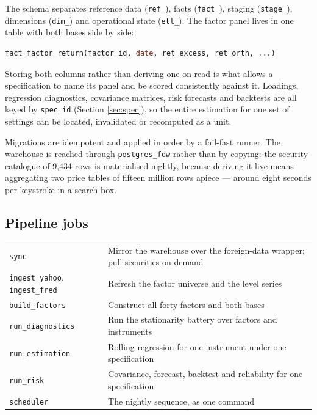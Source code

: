 \documentclass[11pt,a4paper]{article}
\newcommand{\code}[1]{\texttt{\small #1}}
\begin{document}
The schema separates reference data (\code{ref\_}), facts (\code{fact\_}),
staging (\code{stage\_}), dimensions (\code{dim\_}) and operational state
(\code{etl\_}). The factor panel lives in one table with both bases side by side:

\begin{lstlisting}[language=SQL]
fact_factor_return(factor_id, date, ret_excess, ret_orth, ...)
\end{lstlisting}

Storing both columns rather than deriving one on read is what allows a specification
to name its panel and be scored consistently against it. Loadings, regression
diagnostics, covariance matrices, risk forecasts and backtests are all keyed by
\code{spec\_id} (Section \ref{sec:spec}), so the entire estimation for one set of
settings can be located, invalidated or recomputed as a unit.

Migrations are idempotent and applied in order by a fail-fast runner. The warehouse is
reached through \code{postgres\_fdw} rather than by copying: the security catalogue of
9{,}434 rows is materialised nightly, because deriving it live means aggregating two
price tables of fifteen million rows apiece --- around eight seconds per keystroke in
a search box.

\subsection{Pipeline jobs}

\begin{center}
\small
\begin{tabularx}{\textwidth}{@{}lX@{}}
\toprule
\code{sync} & Mirror the warehouse over the foreign-data wrapper; pull securities on demand \\
\code{ingest\_yahoo}, \code{ingest\_fred} & Refresh the factor universe and the level series \\
\code{build\_factors} & Construct all forty factors and both bases \\
\code{run\_diagnostics} & Run the stationarity battery over factors and instruments \\
\code{run\_estimation} & Rolling regression for one instrument under one specification \\
\code{run\_risk} & Covariance, forecast, backtest and reliability for one specification \\
\code{scheduler} & The nightly sequence, as one command \\
\bottomrule
\end{tabularx}
\end{center}
\end{document}
